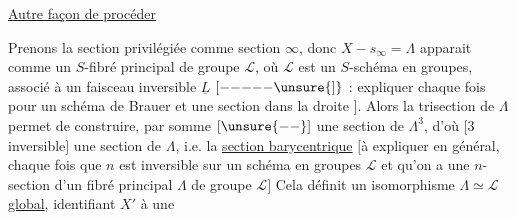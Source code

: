 \uline{Autre façon de procéder}

Prenons la section privilégiée comme section $\infty$, donc $X-s_{\infty}=\Lambda$ apparait comme un $S$-fibré principal   de groupe $\mathcal L$, où $\mathcal L$ est un $S$-schéma en groupes, associé à un  faisceau inversible $\underline L$ \margin{$\Vert$} $[\mathord{-}\mathord{-}\mathord{-}\mathord{-}\mathord{-}\unsure{]}$ : expliquer chaque fois pour un schéma de Brauer  et une section dans la droite \unsure{--}$]$. Alors la  trisection de $\Lambda$ permet de construire, par somme $[\unsure{--}]$ une section de $\Lambda^{3}$, d'où $[3$  inversible$]$ une section de $\Lambda$, i.e. la \uline{section barycentrique} $[$à expliquer en général, chaque fois que $n$ est inversible sur un schéma en groupes  $\mathcal L$ et qu'on a une $n$-section d'un fibré principal $\Lambda$ de groupe $\mathcal L]$ Cela définit un isomorphisme $\Lambda\simeq\mathcal L$ \uline{global}, identifiant $X'$ à une

